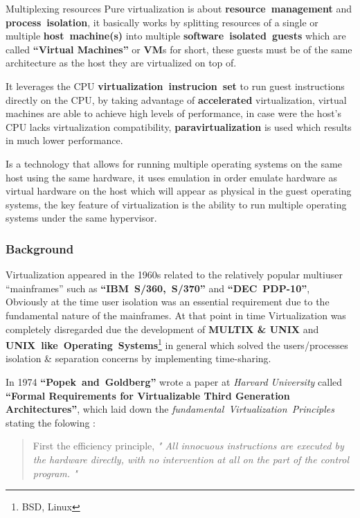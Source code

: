 \documentclass[
  14pt,
  english,
  a4paper,
]{scrreprt}
\begin{document}
Multiplexing resources Pure virtualization is about
\textbf{resource~management} and \textbf{process~isolation}, it
basically works by splitting resources of a single or multiple
\textbf{host~machine(s)} into multiple \textbf{software~isolated~guests}
which are called \textbf{``Virtual Machines''} or \textbf{VM}s for
short, these guests must be of the same architecture as the host they
are virtualized on top of.

It leverages the CPU \textbf{virtualization~instrucion~set} to run guest
instructions directly on the CPU, by taking advantage of
\textbf{accelerated} virtualization, virtual machines are able to
achieve high levels of performance, in case were the host's CPU lacks
virtualization compatibility, \textbf{paravirtualization} is used which
results in much lower performance.

Is a technology that allows for running multiple operating systems on
the same host using the same hardware, it uses emulation in order
emulate hardware as virtual hardware on the host which will appear as
physical in the guest operating systems, the key feature of
virtualization is the ability to run multiple operating systems under
the same hypervisor.

\hypertarget{background-1}{%
\subsubsection{Background}\label{background-1}}

Virtualization appeared in the 1960s related to the relatively popular
multiuser ``mainframes'' such as \textbf{``IBM~S/360,~S/370''} and
\textbf{``DEC~PDP-10''}, Obviously at the time user isolation was an
essential requirement due to the fundamental nature of the mainframes.
At that point in time Virtualization was completely disregarded due the
development of \textbf{MULTIX \& UNIX} and
\textbf{UNIX~like~Operating~Systems}\footnote{BSD, Linux} in general
which solved the users/processes isolation \& separation concerns by
implementing time-sharing.

In 1974 \textbf{``Popek~and~Goldberg''} wrote a paper at \emph{Harvard
University} called \textbf{``Formal Requirements for Virtualizable Third
Generation Architectures''}, which laid down the
\emph{fundamental~Virtualization~Principles} stating the folowing :

\begin{quote}
First the efficiency principle, \emph{" All innocuous instructions are
executed by the hardware directly, with no intervention at all on the
part of the control program. "}
\end{quote}
\end{document}
